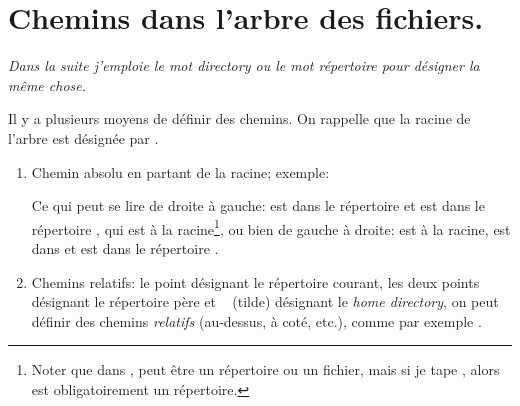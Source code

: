 \section{Chemins dans l'arbre des fichiers.}
\textsl{Dans la suite j'emploie le mot directory ou le mot répertoire pour
désigner la même chose.}


Il y a plusieurs moyens de définir des chemins. On rappelle que la
racine de l'arbre est désignée par \com{/}.


\begin{enumerate}
  \item Chemin absolu en partant de la racine; exemple:
    
    Ce qui peut se lire de droite à gauche:   est dans le
    répertoire  et  est dans le répertoire
    , qui est à la racine\footnote{Noter que dans
      ,  peut être un répertoire ou
      un fichier, mais si je tape , alors
       est obligatoirement un répertoire.}, ou bien de
    gauche à droite:  est à la racine,  est dans
     et  est dans le répertoire .

    
    
  \item Chemins relatifs:  le point  désignant le répertoire
    courant, les deux points  désignant le 
    répertoire père et \com{\textasciitilde} ~ (tilde) désignant le
    \textsl{home directory}, 
    on peut définir des chemins \textsl{relatifs} (au-dessus,
    à coté, etc.), comme par exemple .
\end{enumerate}
    
